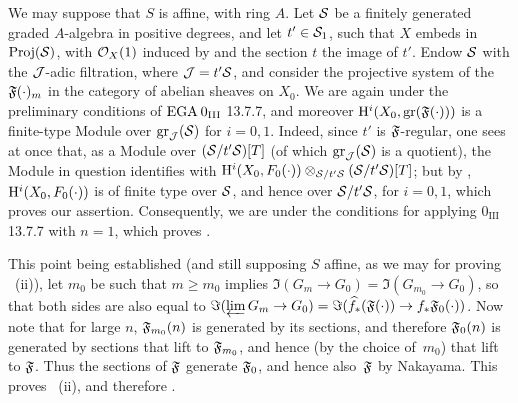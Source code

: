 We may suppose that $S$ is affine, with ring $A$. Let $\mathcal S$ be a finitely generated graded $A$-algebra in positive degrees, and let $t'\in\mathcal S_1$, such that $X$ embeds in $\operatorname{Proj}(\mathcal S)$, with $\mathcal O_X(1)$ induced by  and the section $t$ the image of $t'$. Endow $\mathcal S$ with the $\mathcal J$-adic filtration, where $\mathcal J=t'\mathcal S$, and consider the projective system of the $\mathfrak F(\cdot)_m$ in the category of abelian sheaves on $X_0$. We are again under the preliminary conditions of $\textup{EGA}\kern.2em 0_{\textup{III}}$ 13.7.7, and moreover $\mathrm H^i(X_0, \operatorname{gr}(\mathfrak F(\cdot)))$ is a finite-type Module over $\operatorname{gr}_\mathcal J(\mathcal S)$ for $i=0, 1$. Indeed, since $t'$ is $\mathfrak F$-regular, one sees at once that, as a Module over $(\mathcal S /t'\mathcal S)[T]$ (of which $\operatorname{gr}_\mathcal J(\mathcal S)$ is a quotient), the Module in question identifies with $\mathrm H^i(X_0, F_0(\cdot))\otimes_{\mathcal S /t'\mathcal S}(\mathcal S /t'\mathcal S)[T]$; but by , $\mathrm H^i(X_0, F_0(\cdot))$ is of finite type over $\mathcal S$, and hence over $\mathcal S /t'\mathcal S$, for $i=0, 1$, which proves our assertion. Consequently, we are under the conditions for applying $0_{\text{III}}$ 13.7.7 with $n=1$, which proves .

This point being established (and still supposing $S$ affine, as we may for proving ~(ii)), let $m_0$ be such that $m\geq m_0$ implies $\Im(G_m\to G_0)= \Im(G_{m_0}\to G_0)$, so that both sides are also equal to $\Im(\varprojlim G_m\to G_0) = \Im(\widehat{f}_\ast(\mathfrak F(\cdot))\to f_\ast\mathfrak F_0(\cdot))$. Now note that for large $n$, $\mathfrak F_{m_0}(n)$ is generated by its sections, and therefore $\mathfrak F_0(n)$ is generated by sections that lift to $\mathfrak F_{m_0}$, and hence (by the choice of~$m_0$) that lift to $\mathfrak F$. Thus the sections of $\mathfrak F$ generate $\mathfrak F_0$, and hence also~$\mathfrak F$ by Nakayama. This proves ~(ii), and therefore .

